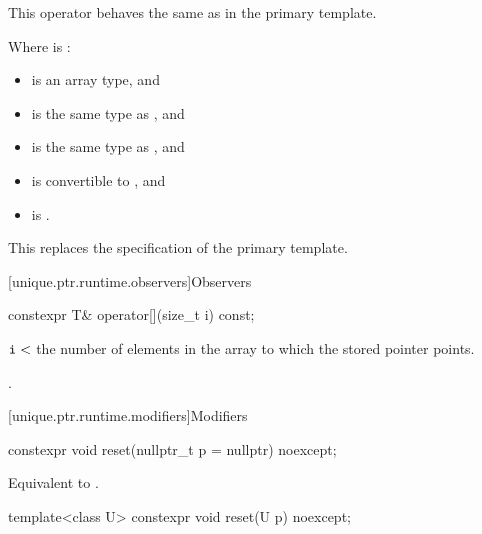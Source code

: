 \begin{itemdescr}
\pnum
This operator behaves the same as in the primary template.

\pnum
\constraints
Where  is :
\begin{itemize}
\item {} is an array type, and
\item {} is the same type as , and
\item {} is the same type as , and
\item {} is convertible to , and
\item {} is .
\end{itemize}

\begin{note}
This replaces the \constraints specification of the primary template.
\end{note}
\end{itemdescr}

[unique.ptr.runtime.observers]{Observers}

%
\begin{itemdecl}
constexpr T& operator[](size_t i) const;
\end{itemdecl}

\begin{itemdescr}
\pnum
\expects
$\texttt{\protect i} <$ the
number of elements in the array to which
the stored pointer points.

\pnum
\returns
{}.
\end{itemdescr}

[unique.ptr.runtime.modifiers]{Modifiers}

%
\begin{itemdecl}
constexpr void reset(nullptr_t p = nullptr) noexcept;
\end{itemdecl}

\begin{itemdescr}
\pnum
\effects
Equivalent to .
\end{itemdescr}

%
\begin{itemdecl}
template<class U> constexpr void reset(U p) noexcept;
\end{itemdecl}

